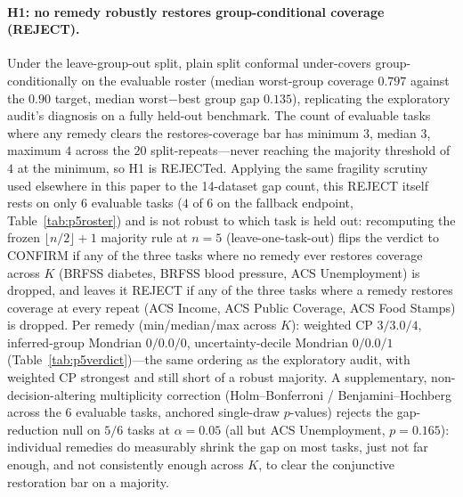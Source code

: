\documentclass[pdflatex,sn-mathphys-num]{sn-jnl}
\begin{document}
\paragraph{H1: no remedy robustly restores group-conditional coverage (REJECT).} Under the leave-group-out
split, plain split conformal under-covers group-conditionally on the evaluable roster (median worst-group
coverage $0.797$ against the $0.90$ target, median worst$-$best group gap $0.135$), replicating the
exploratory audit's diagnosis on a fully held-out benchmark. The count of evaluable tasks where any remedy
clears the restores-coverage bar has minimum $3$, median $3$, maximum $4$ across the $20$ split-repeats---never
reaching the majority threshold of $4$ at the minimum, so H1 is REJECTed. Applying the same
fragility scrutiny used elsewhere in this paper to the 14-dataset gap count, this REJECT itself rests
on only $6$ evaluable tasks ($4$ of $6$ on the fallback endpoint, Table~\ref{tab:p5roster}) and is not
robust to which task is held out: recomputing the frozen $\lfloor n/2\rfloor{+}1$ majority rule at
$n{=}5$ (leave-one-task-out) flips the verdict to CONFIRM if any of the three tasks where no remedy
ever restores coverage across $K$ (BRFSS diabetes, BRFSS blood pressure,
ACS Unemployment) is dropped, and leaves it REJECT if any of the three tasks where a remedy
restores coverage at every repeat (ACS Income, ACS Public Coverage, ACS Food Stamps) is
dropped. Per remedy (min/median/max
across $K$): weighted CP $3/3.0/4$, inferred-group Mondrian $0/0.0/0$, uncertainty-decile Mondrian $0/0.0/1$
(Table~\ref{tab:p5verdict})---the same ordering as the exploratory audit, with weighted CP strongest and
still short of a robust majority. A supplementary, non-decision-altering multiplicity correction
(Holm--Bonferroni / Benjamini--Hochberg across the $6$ evaluable tasks, anchored single-draw $p$-values)
rejects the gap-reduction null on $5/6$ tasks at $\alpha=0.05$ (all but ACS Unemployment, $p=0.165$):
individual remedies do measurably shrink the gap on most tasks, just not far enough, and not consistently
enough across $K$, to clear the conjunctive restoration bar on a majority.
\end{document}
